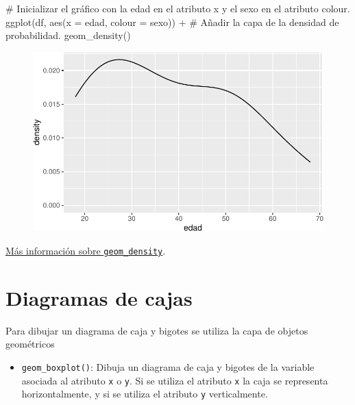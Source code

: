 \documentclass[
  a4paper,
]{scrreport}
\newenvironment{Shaded}{\begin{snugshade}}{\end{snugshade}}
\newcommand{\AttributeTok}[1]{\textcolor[rgb]{0.40,0.45,0.13}{#1}}
\newcommand{\CommentTok}[1]{\textcolor[rgb]{0.37,0.37,0.37}{#1}}
\newcommand{\FunctionTok}[1]{\textcolor[rgb]{0.28,0.35,0.67}{#1}}
\newcommand{\NormalTok}[1]{\textcolor[rgb]{0.00,0.23,0.31}{#1}}
\newcommand{\SpecialCharTok}[1]{\textcolor[rgb]{0.37,0.37,0.37}{#1}}
\providecommand{\tightlist}{%
  \setlength{\itemsep}{0pt}\setlength{\parskip}{0pt}}\usepackage{longtable,booktabs,array}
\theoremstyle{definition}
\theoremstyle{definition}
\theoremstyle{remark}
\begin{document}
\begin{Shaded}
\begin{Highlighting}[]
\CommentTok{\# Inicializar el gráfico con la edad en el atributo x y el sexo en el atributo colour.}
\FunctionTok{ggplot}\NormalTok{(df, }\FunctionTok{aes}\NormalTok{(}\AttributeTok{x =}\NormalTok{ edad, }\AttributeTok{colour =}\NormalTok{ sexo)) }\SpecialCharTok{+}
\CommentTok{\# Añadir la capa de la densidad de probabilidad.}
    \FunctionTok{geom\_density}\NormalTok{()}
\end{Highlighting}
\end{Shaded}

\begin{figure}[H]

{\centering \includegraphics{./07-graficos_files/figure-pdf/unnamed-chunk-19-1.pdf}

}

\end{figure}

\href{https://ggplot2.tidyverse.org/reference/geom_density.html}{Más
información sobre \texttt{geom\_density}}.

\hypertarget{diagramas-de-cajas}{%
\section{Diagramas de cajas}\label{diagramas-de-cajas}}

Para dibujar un diagrama de caja y bigotes se utiliza la capa de objetos
geométricos

\begin{itemize}
\tightlist
\item
  \texttt{geom\_boxplot()}: Dibuja un diagrama de caja y bigotes de la
  variable asociada al atributo \texttt{x} o \texttt{y}. Si se utiliza
  el atributo \texttt{x} la caja se representa horizontalmente, y si se
  utiliza el atributo \texttt{y} verticalmente.
\end{itemize}
\end{document}
